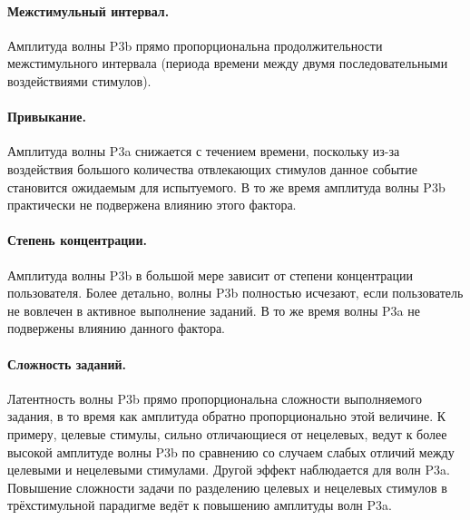 \documentclass[12pt,a4paper,oneside,fleqn,leqno]{article}
\newcounter{pe} %
\begin{document}
	\paragraph{Межстимульный интервал.} Амплитуда волны P3b прямо пропорциональна продолжительности межстимульного интервала (периода времени между двумя последовательными воздействиями стимулов).
	\paragraph{Привыкание.} Амплитуда волны P3a снижается с течением времени, поскольку из-за воздействия большого количества отвлекающих стимулов данное событие становится ожидаемым для испытуемого. В то же время амплитуда волны P3b практически не подвержена влиянию этого фактора.
	\paragraph{Степень концентрации.} Амплитуда волны P3b в большой мере зависит от степени концентрации пользователя. Более детально, волны P3b полностью исчезают, если пользователь не вовлечен в активное выполнение заданий. В то же время волны P3a не подвержены влиянию данного фактора.
	\paragraph{Сложность заданий.} Латентность волны P3b прямо пропорциональна сложности выполняемого  задания, в то время как амплитуда обратно пропорционально этой величине. К примеру, целевые стимулы, сильно отличающиеся от нецелевых, ведут к более высокой амплитуде волны P3b по сравнению со случаем слабых отличий между целевыми и нецелевыми стимулами.  Другой эффект наблюдается для волн P3a. Повышение сложности задачи по разделению целевых и нецелевых стимулов в трёхстимульной парадигме ведёт к повышению амплитуды волн P3a.
	
\end{document}
